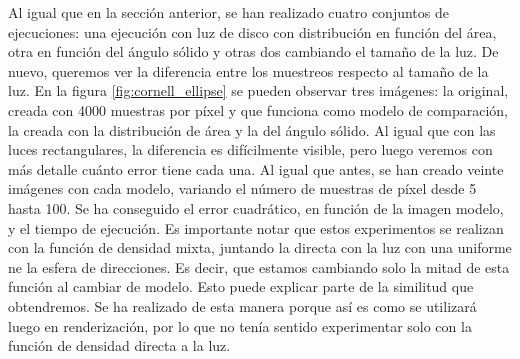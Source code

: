 \documentclass{scrbook}
\begin{document}
Al igual que en la sección anterior, se han realizado cuatro conjuntos de ejecuciones: una ejecución con luz de disco con distribución en función del área, otra en función del ángulo sólido y otras dos cambiando el tamaño de la luz. De nuevo, queremos ver la diferencia entre los muestreos respecto al tamaño de la luz. En la figura \ref{fig:cornell_ellipse} se pueden observar tres imágenes: la original, creada con 4000 muestras por píxel y que funciona como modelo de comparación, la creada con la distribución de área y la del ángulo sólido. Al igual que con las luces rectangulares, la diferencia es difícilmente visible, pero luego veremos con más detalle cuánto error tiene cada una. Al igual que antes, se han creado veinte imágenes con cada modelo, variando el número de muestras de píxel desde 5 hasta 100. Se ha conseguido el error cuadrático, en función de la imagen modelo, y el tiempo de ejecución. Es importante notar que estos experimentos se realizan con la función de densidad mixta, juntando la directa con la luz con una uniforme ne la esfera de direcciones. Es decir, que estamos cambiando solo la mitad de esta función al cambiar de modelo. Esto puede explicar parte de la similitud que obtendremos. Se ha realizado de esta manera porque así es como se utilizará luego en renderización, por lo que no tenía sentido experimentar solo con la función de densidad directa a la luz. 
\end{document}
